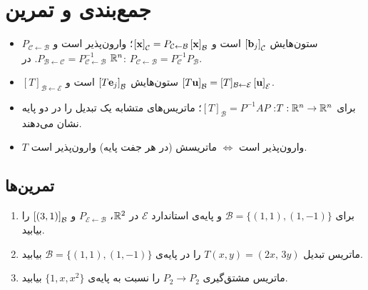\section{جمع‌بندی و تمرین}

\begin{summary}
\begin{itemize}
  \item $P_{\mathcal{C}\leftarrow\mathcal{B}}$ ستون‌هایش $\left[\mathbf{b}_j\right]_{\mathcal{C}}$ است و $\left[\mathbf{x}\right]_{\mathcal{C}}=P_{\mathcal{C}\leftarrow\mathcal{B}}\left[\mathbf{x}\right]_{\mathcal{B}}$؛ وارون‌پذیر است و $P_{\mathcal{B}\leftarrow\mathcal{C}}=P_{\mathcal{C}\leftarrow\mathcal{B}}^{-1}$. در $\mathbb{R}^n$: $P_{\mathcal{C}\leftarrow\mathcal{B}}=P_{\mathcal{C}}^{-1}P_{\mathcal{B}}$.
  \item $[T]_{\mathcal{B}\leftarrow\mathcal{E}}$ ستون‌هایش $\left[T\mathbf{e}_j\right]_{\mathcal{B}}$ است و $\left[T\mathbf{u}\right]_{\mathcal{B}}=[T]_{\mathcal{B}\leftarrow\mathcal{E}}\left[\mathbf{u}\right]_{\mathcal{E}}$.
  \item برای $T:\mathbb{R}^n\to\mathbb{R}^n$: $[T]_{\mathcal{B}}=P^{-1}AP$؛ ماتریس‌های متشابه یک تبدیل را در دو پایه نشان می‌دهند.
  \item $T$ وارون‌پذیر است $\iff$ ماتریسش (در هر جفت پایه) وارون‌پذیر است.
\end{itemize}
\end{summary}

\subsection*{تمرین‌ها}
\begin{enumerate}
  \item برای $\mathcal{B}=\{(1,1),(1,-1)\}$ و پایه‌ی استاندارد $\mathcal{E}$ در $\mathbb{R}^2$، $P_{\mathcal{E}\leftarrow\mathcal{B}}$ و $\left[(3,1)\right]_{\mathcal{B}}$ را بیابید.
  \item ماتریس تبدیل $T(x,y)=(2x,\,3y)$ را در پایه‌ی $\mathcal{B}=\{(1,1),(1,-1)\}$ بیابید.
  \item ماتریس مشتق‌گیری $P_2\to P_2$ را نسبت به پایه‌ی $\{1,x,x^2\}$ بیابید.
\end{enumerate}

